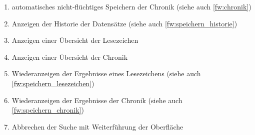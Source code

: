 \begin{enumerate} [label=\bfseries /FW \arabic*0/, leftmargin=*]
	\item automatisches nicht-flüchtiges Speichern der Chronik (siehe auch \ref{fw:chronik}) \label{fw:speichern_chronik}
	\item Anzeigen der Historie der Datensätze (siehe auch \ref{fw:speichern_historie})
	\item Anzeigen einer Übersicht der Lesezeichen \label{fw:lesezeichen_uebersicht}
	\item Anzeigen einer Übersicht der Chronik \label{fw:chronik_uebersicht}
	\item Wiederanzeigen der Ergebnisse eines Lesezeichens (siehe auch \ref{fw:speichern_lesezeichen}) \label{fw:lesezeichen}
	\item Wiederanzeigen der Ergebnisse der Chronik (siehe auch \ref{fw:speichern_chronik}) \label{fw:chronik}
	\newline
	\item Abbrechen der Suche mit Weiterführung der Oberfläche \label{fw:suche_abbrechen}
\end{enumerate}
\pagebreak
